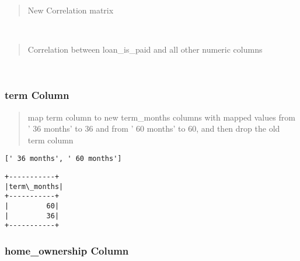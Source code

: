 \documentclass[11pt]{article}
\makeatletter
\newcommand{\boxspacing}{\kern\kvtcb@left@rule\kern\kvtcb@boxsep}
\newcommand{\prompt}[4]{
        {\ttfamily\llap{{\color{#2}[#3]:\hspace{3pt}#4}}\vspace{-\baselineskip}}
    }
\makeatother
\begin{document}
    \begin{quote}
New Correlation matrix
\end{quote}

    \begin{center}
    \end{center}
    { \hspace*{\fill} \\}
    
    \begin{quote}
Correlation between loan\_is\_paid and all other numeric columns
\end{quote}

    \begin{center}
    \end{center}
    { \hspace*{\fill} \\}
    
    \hypertarget{term-column}{%
\subsubsection{term Column}\label{term-column}}

    \begin{quote}
map term column to new term\_months columns with mapped values from ' 36
months' to 36 and from ' 60 months' to 60, and then drop the old term
column
\end{quote}

            \begin{tcolorbox}[breakable, size=fbox, boxrule=.5pt, pad at break*=1mm, opacityfill=0]
\prompt{Out}{outcolor}{44}{\boxspacing}
\begin{Verbatim}[commandchars=\\\{\}]
[' 36 months', ' 60 months']
\end{Verbatim}
\end{tcolorbox}
        
    \begin{Verbatim}[commandchars=\\\{\}]
+-----------+
|term\_months|
+-----------+
|         60|
|         36|
+-----------+

    \end{Verbatim}

    \hypertarget{home_ownership-column}{%
\subsubsection{home\_ownership Column}\label{home_ownership-column}}
\end{document}
